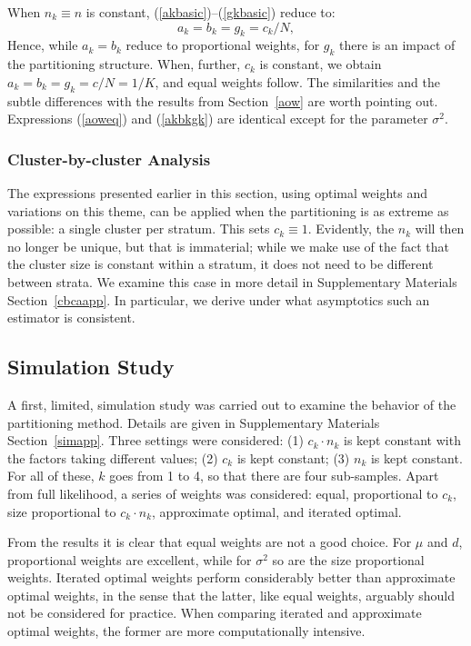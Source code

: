 \documentclass[11pt,a5paper,twoside]{book}
\begin{document}
When $n_k\equiv n$ is constant, (\ref{akbasic})--(\ref{gkbasic}) reduce to:
\begin{equation}
\label{akbkgk}
a_k=b_k=g_k={c_k}/{N},
\end{equation}
Hence, while $a_k=b_k$ reduce to proportional weights,  for $g_k$ there is an impact of the partitioning structure. 
When, further, $c_k$ is constant, we obtain $a_k=b_k=g_k=c/N=1/K$,
and equal weights follow. The similarities and the subtle differences with the results from Section~\ref{aow} 
are worth pointing out. Expressions (\ref{aoweq}) 
and (\ref{akbkgk}) are identical except for the parameter $\sigma^2$.

\subsubsection{Cluster-by-cluster Analysis}\label{cbca}

The expressions presented earlier in this section, using optimal weights 
and variations on this theme, can be applied when the partitioning is 
as extreme as possible: a single cluster per stratum. This sets $c_k\equiv 1$. Evidently, the $n_k$ will 
then no longer be unique, but that is immaterial; while we make use of the fact that the cluster size is  constant within a stratum, it does not need to be different 
between  strata. We examine this case in more detail in Supplementary Materials Section~\ref{cbcaapp}.
In particular, we derive under what asymptotics such an estimator is consistent. 



\subsection{Simulation Study}
\label{simulation}

A first, limited, simulation study was carried out to examine the behavior of the 
partitioning method. Details are given in Supplementary Materials Section~\ref{simapp}.
Three settings were considered: (1) $c_k\cdot n_k$ is kept constant with the factors taking different values; (2) $c_k$ is kept constant; (3) $n_k$ is kept constant. For all of these, $k$ goes from 1 to 4, so that there are four sub-samples. Apart from full likelihood, a series of weights was considered: equal, proportional  to $c_k$, size proportional to $c_k\cdot n_k$, approximate optimal, and iterated optimal.

From the results it is clear that equal weights are not a good choice. For $\mu$ and $d$,  proportional weights are excellent, while for $\sigma^2$ so are the size proportional weights. Iterated optimal weights perform considerably better than approximate optimal weights, in the sense  that the latter, like equal weights, arguably should not be considered  for practice. When comparing iterated and approximate optimal weights, 
the former are more computationally intensive.
\end{document}
